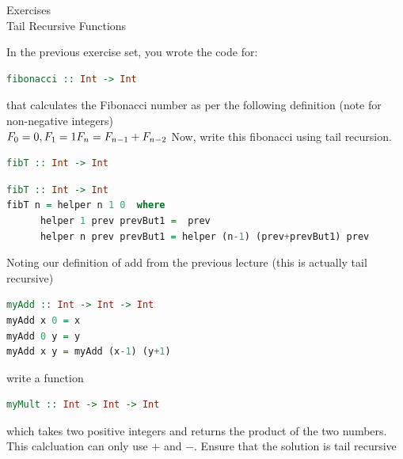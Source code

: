 \documentclass{article}
\newcommand\ExTitle{Tail Recursive Functions}
\newcommand\fullExTitle{Exercises\\ \ExTitle }
\begin{document}
\begin{Huge}
	\begin{center}
	\fullExTitle
	\end{center}
\end{Huge}
\begin{exercise}
In the previous exercise set, you wrote the code for:
\begin{lstlisting}[language=Haskell]
	fibonacci :: Int -> Int
\end{lstlisting}
that calculates the Fibonacci number as per the following definition (note for non-negative integers)\\
$
F_{0} = 0, F_{1} = 1 \\
F_{n} = F_{n-1} + F_{n-2}
$
Now, write this fibonacci using tail recursion.

\begin{lstlisting}[language=Haskell]
	fibT :: Int -> Int
\end{lstlisting}
\end{exercise}

\begin{solution}
\begin{lstlisting}[language=Haskell]
fibT :: Int -> Int
fibT n = helper n 1 0  where
	  helper 1 prev prevBut1 =  prev 
	  helper n prev prevBut1 = helper (n-1) (prev+prevBut1) prev
\end{lstlisting}
\end{solution}
\begin{exercise}
Noting our definition of add from the previous lecture (this is actually tail recursive)
\begin{lstlisting}[language=Haskell]
myAdd :: Int -> Int -> Int
myAdd x 0 = x
myAdd 0 y = y
myAdd x y = myAdd (x-1) (y+1)
\end{lstlisting}
write a function 
\begin{lstlisting}[language=Haskell]
myMult :: Int -> Int -> Int
\end{lstlisting}
which takes two positive integers and returns the product of the two numbers. This calcluation can only use $+$ and $-$.
Ensure that the solution is tail recursive
\end{exercise}
\end{document}
